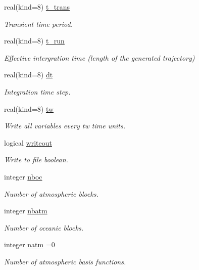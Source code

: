 \begin{DoxyCompactItemize}
real(kind=8) \hyperlink{namespaceparams_aabf0943afa2272a8bbbd58c49ad0db38}{t\+\_\+trans}
\begin{DoxyCompactList}\small\item\em Transient time period. \end{DoxyCompactList}\item 
real(kind=8) \hyperlink{namespaceparams_a923cab407956c82921069b7ec0e69eb9}{t\+\_\+run}
\begin{DoxyCompactList}\small\item\em Effective intergration time (length of the generated trajectory) \end{DoxyCompactList}\item 
real(kind=8) \hyperlink{namespaceparams_a2d658dc74d6a45a2e71b06bde97df084}{dt}
\begin{DoxyCompactList}\small\item\em Integration time step. \end{DoxyCompactList}\item 
real(kind=8) \hyperlink{namespaceparams_a0955c0296092bb15d2dcd120d72ad479}{tw}
\begin{DoxyCompactList}\small\item\em Write all variables every tw time units. \end{DoxyCompactList}\item 
logical \hyperlink{namespaceparams_affc7b423a975c0e92b62e67ed04edea5}{writeout}
\begin{DoxyCompactList}\small\item\em Write to file boolean. \end{DoxyCompactList}\item 
integer \hyperlink{namespaceparams_a54123b5a947703d21d0c882dec6780ac}{nboc}
\begin{DoxyCompactList}\small\item\em Number of atmospheric blocks. \end{DoxyCompactList}\item 
integer \hyperlink{namespaceparams_aa5dc201b0a59d8bb25a5dc52d2ed3cac}{nbatm}
\begin{DoxyCompactList}\small\item\em Number of oceanic blocks. \end{DoxyCompactList}\item 
integer \hyperlink{namespaceparams_a4f46551b6a8ad183d2dced1da3dc5fed}{natm} =0
\begin{DoxyCompactList}\small\item\em Number of atmospheric basis functions. \end{DoxyCompactList}\item 

\end{DoxyCompactItemize}
